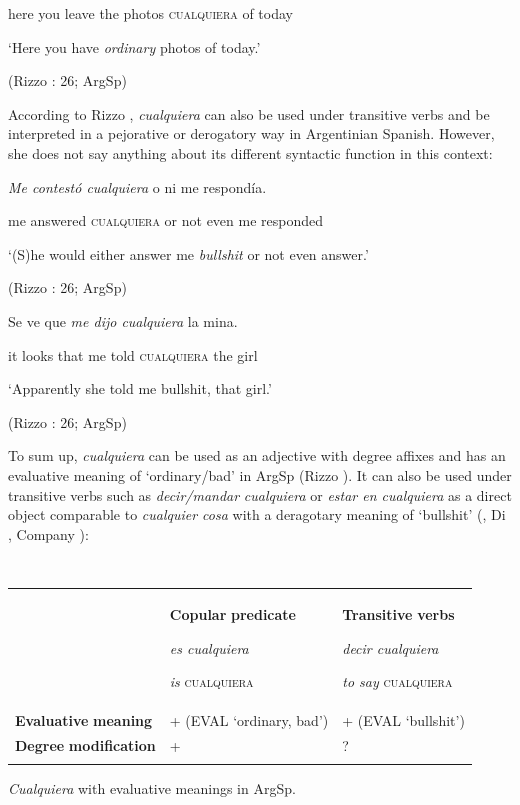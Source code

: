   here  you  leave  the  photos  \textsc{cualquiera}  of  today

  ‘Here you have \textit{ordinary} photos of today.’

  (Rizzo \citealt{Salierno2013}: 26; ArgSp)

According to Rizzo \citet{Salierno2013}, \textit{cualquiera} can also be used under transitive verbs and be interpreted in a pejorative or derogatory way in Argentinian Spanish. However, she does not say anything about its different syntactic function in this context:

  \textit{Me  contestó  cualquiera} o  ni  me  respondía.

  me  answered  \textsc{cualquiera} or  not even  me  responded

  ‘(S)he would either answer me \textit{bullshit} or not even answer.’

  (Rizzo \citealt{Salierno2013}: 26; ArgSp)

  Se  ve  que  \textit{me  dijo  cualquiera} la  mina.

  it  looks  that  me  told  \textsc{cualquiera}  the  girl

  ‘Apparently she told me bullshit, that girl.’

  (Rizzo \citealt{Salierno2013}: 26; ArgSp)

To sum up, \textit{cualquiera} can be used as an adjective with degree affixes and has an evaluative meaning of ‘ordinary/bad’ in ArgSp (Rizzo \citealt{Salierno2013}). It can also be used under transitive verbs such as \textit{decir/mandar} \textit{cualquiera} or \textit{estar en cualquiera} as a direct object comparable to \textit{cualquier cosa} with a deragotary meaning of ‘bullshit’ (\citealt{Conde2011}, Di \citealt{Tullio2013}, Company \citealt{Company2009}):


\begin{table}
\begin{tabularx}{\textwidth}{XXX}
\lsptoprule
\multicolumn{1}{c}{} & { \textbf{Copular} \textbf{predicate}}

{ \textit{es cualquiera}}

 \textit{is} \textsc{cualquiera} & { \textbf{Transitive} \textbf{verbs}}

{ \textit{decir cualquiera}}

 \textit{to say} \textsc{cualquiera}\\
\textbf{Evaluative} \textbf{meaning} & + (EVAL ‘ordinary, bad’) & + (EVAL ‘bullshit’)\\
\textbf{Degree} \textbf{modification} & + & ?\\
\lspbottomrule
\end{tabularx}
\caption{\label{tab:} ~}\textit{Cualquiera} with evaluative meanings in ArgSp.
\end{table}

